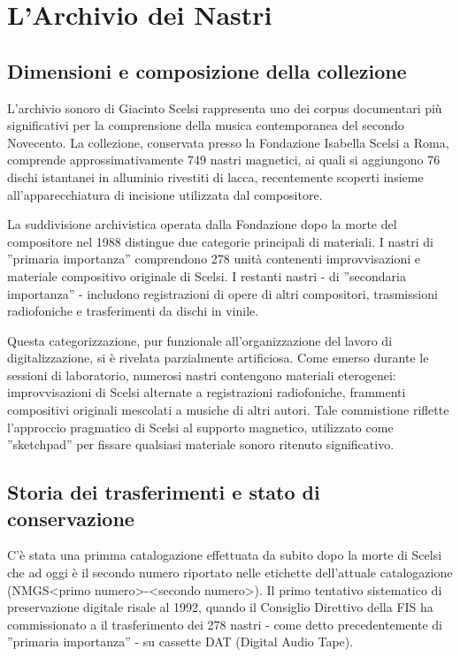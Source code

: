 
\section{L'Archivio dei Nastri}
\subsection{Dimensioni e composizione della collezione}
L'archivio sonoro di Giacinto Scelsi rappresenta uno dei corpus documentari più significativi per la comprensione della musica contemporanea del secondo Novecento. La collezione, conservata presso la Fondazione Isabella Scelsi a Roma, comprende approssimativamente 749 nastri magnetici\cite{Bernardini2007recoveringgia}, ai quali si aggiungono 76 dischi istantanei in alluminio rivestiti di lacca, recentemente scoperti insieme all'apparecchiatura di incisione utilizzata dal compositore\cite{Bernardini2012themul}.

La suddivisione archivistica operata dalla Fondazione dopo la morte del compositore nel 1988 distingue due categorie principali di materiali. I nastri di ''primaria importanza'' comprendono 278 unità contenenti improvvisazioni e materiale compositivo originale di Scelsi. I restanti nastri - di ''secondaria importanza'' - includono registrazioni di opere di altri compositori, trasmissioni radiofoniche e trasferimenti da dischi in vinile\cite[p. 184]{Bernardini2012themul}.

Questa categorizzazione, pur funzionale all'organizzazione del lavoro di digitalizzazione, si è rivelata parzialmente artificiosa. Come emerso durante le sessioni di laboratorio, numerosi nastri contengono materiali eterogenei: improvvisazioni di Scelsi alternate a registrazioni radiofoniche, frammenti compositivi originali mescolati a musiche di altri autori. Tale commistione riflette l'approccio pragmatico di Scelsi al supporto magnetico, utilizzato come ''sketchpad'' per fissare qualsiasi materiale sonoro ritenuto significativo\cite[p. 170]{Bernardini2012themul}.
\subsection{Storia dei trasferimenti e stato di conservazione}
C'è stata una primma catalogazione effettuata da  subito dopo la morte di Scelsi che ad oggi è il secondo numero riportato nelle etichette dell'attuale catalogazione (NMGS<primo numero>-<secondo numero>).
Il primo tentativo sistematico di preservazione digitale risale al 1992, quando il Consiglio Direttivo della FIS ha commissionato a  il trasferimento dei 278 nastri - come detto precedentemente di ''primaria importanza'' - su cassette DAT (Digital Audio Tape). 

